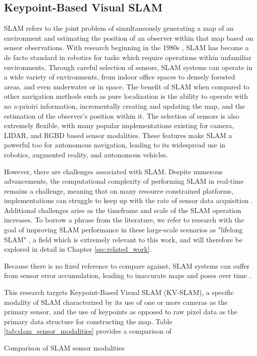 \subsection{Keypoint-Based Visual SLAM}

SLAM refers to the joint problem of simultaneously generating a map of an environment and estimating the position of an observer within that map based on sensor observations. With research beginning in the 1980s \cite{smithEstimatingUncertainSpatial1988}, SLAM has become a de facto standard in robotics for tasks which require operations within unfamiliar environments. Through careful selection of sensors, SLAM systems can operate in a wide variety of environments, from indoor office spaces to densely forested areas, and even underwater or in space. The benefit of SLAM when compared to other navigation methods such as pure localization is the ability to operate with no a-prioiri information, incrementally creating and updating the map, and the estimation of the observer's position within it. The selection of sensors is also extremely flexible, with many popular implementations existing for camera, LIDAR, and RGBD based sensor modalities. These features make SLAM a powerful too for autonomous navigation, leading to its widespread use in robotics, augmented reality, and autonomous vehicles.

However, there are challenges associated with SLAM. Despite numerous advancements, the computational complexity of performing SLAM in real-time remains a challenge, meaning that on many resource constrained platforms, implementations can struggle to keep up with the rate of sensor data acquisition \cite{semenovaQuantitativeAnalysisSystem2022}. Additional challenges arise as the timeframe and scale of the SLAM operation increases. To borrow a phrase from the literature, we refer to research with the goal of improving SLAM performance in these large-scale scenarios as "lifelong SLAM" \cite{shiAreWeReady2020}, a field which is extremely relevant to this work, and will therefore be explored in detail in Chapter \ref{sec:related_work}.

Because there is no fixed reference to compare against, SLAM systems can suffer from sensor error accumulation, leading to inaccurate maps and poses over time \cite{cadenaPresentFutureSimultaneous2016}.

This research targets Keypoint-Based Visual SLAM (KV-SLAM), a specific modality of SLAM characterized by its use of one or more cameras as the primary sensor, and the use of keypoints as opposed to raw pixel data as the primary data structure for constructing the map. Table \ref{tab:slam_sensor_modalities} provides a comparison of 

\begin{table}[ht!]
    \centering
    \caption{Comparison of SLAM sensor modalities}
    \label{tab:slam_sensor_modalities}
\end{table}